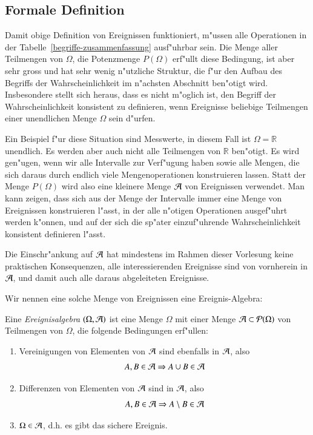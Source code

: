 \subsection{Formale Definition}
Damit obige Definition von Ereignissen funktioniert, m"ussen
alle Operationen in der Tabelle~\ref{begriffe-zusammenfassung}
ausf"uhrbar sein.
Die Menge aller Teilmengen von $\Omega$, die Potenzmenge
$P(\Omega)$ erf"ullt diese Bedingung,
ist aber sehr gross und hat sehr wenig n"utzliche Struktur, die
f"ur den Aufbau des Begriffs der Wahrscheinlichkeit im n"achsten
Abschnitt ben"otigt wird.
Insbesondere stellt sich heraus, dass es nicht m"oglich ist,
den Begriff der Wahrscheinlichkeit konsistent zu definieren, wenn
Ereignisse beliebige Teilmengen einer unendlichen Menge $\Omega$
sein d"urfen.

Ein Beispiel f"ur diese Situation sind Messwerte, in diesem
Fall ist $\Omega=\mathbb R$ unendlich.
Es werden aber auch nicht alle Teilmengen von $\mathbb R$ ben"otigt.
Es wird gen"ugen, wenn wir alle Intervalle zur Verf"ugung haben sowie
alle Mengen, die sich daraus durch endlich viele Mengenoperationen
konstruieren lassen.
Statt der Menge $P(\Omega)$ wird also eine kleinere Menge $\cal A$
von Ereignissen verwendet.
Man kann zeigen, dass sich aus der Menge der Intervalle immer 
eine Menge von Ereignissen konstruieren l"asst, in der alle
n"otigen Operationen ausgef"uhrt werden k"onnen, und auf der sich
die sp"ater einzuf"uhrende Wahrscheinlichkeit konsistent definieren
l"asst.

Die Einschr"ankung auf $\cal A$ hat mindestens im Rahmen dieser
Vorlesung keine praktischen Konsequenzen, alle interessierenden
Ereignisse sind von vornherein in $\cal A$, und damit auch alle daraus
abgeleiteten Ereignisse.

Wir nennen eine solche Menge von Ereignissen eine Ereignis-Algebra:

\begin{definition}
\label{def-ereignisalgebra}
Eine {\em Ereignisalgebra} $(\Omega,{\cal A})$ ist
eine Menge $\Omega$ mit einer Menge ${\cal A }\subset{\cal P}(\Omega)$
von Teilmengen von $\Omega$, die folgende Bedingungen erf"ullen:
\begin{enumerate}
\item Vereinigungen von Elementen von ${\cal A}$ sind ebenfalls in ${\cal A}$,
also
\[
A,B\in {\cal A}\Rightarrow A\cup B\in{\cal A}
\]
\item Differenzen von Elementen von ${\cal A}$ sind in ${\cal A}$, also
\[
A,B\in {\cal A}\Rightarrow A\setminus B\in{\cal A}
\]
\item $\Omega\in{\cal A}$, d.h. es gibt das sichere Ereignis.
\end{enumerate}
\end{definition}

